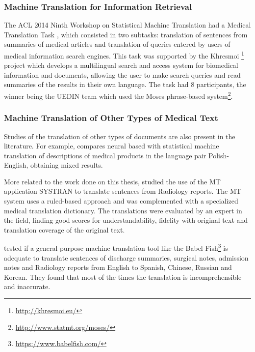 \subsubsection{Machine Translation for Information Retrieval}

The ACL 2014 Ninth Workshop on Statistical Machine Translation had a Medical Translation Task \citep{Bojar2014}, which consisted in two subtasks: translation of sentences from summaries of medical articles and translation of queries entered by users of medical information search engines. This task was supported by the Khresmoi \footnote{\url{http://khresmoi.eu/}} project which develops a multilingual search and access system for biomedical information and documents, allowing the user to make search queries and read summaries of the results in their own language. The task had 8 participants, the winner being the UEDIN team \citep{Durrani2014} which used the Moses phrase-based system\footnote{\url{http://www.statmt.org/moses/}}.

\subsubsection{Machine Translation of Other Types of Medical Text}

Studies of the translation of other types of documents are also present in the literature. For example, \citep{Wok2015} compares neural based with statistical machine translation of descriptions of medical products in the language pair Polish-English, obtaining mixed results.

More related to the work done on this thesis, \citep{Castilla2007a} studied the use of the MT application SYSTRAN to translate sentences from Radiology reports. The MT system uses a ruled-based approach and was complemented with a specialized medical translation dictionary. The translations were evaluated by an expert in the field, finding good scores for understandability, fidelity with original text and translation coverage of the original text.

\citep{Zeng-Treitler2010} tested if a general-purpose machine translation tool like the Babel Fish\footnote{\url{https://www.babelfish.com/}} is adequate to translate sentences of discharge summaries, surgical notes, admission notes and Radiology reports from English to Spanish, Chinese, Russian and Korean. They found that most of the times the translation is incomprehensible and inaccurate.

